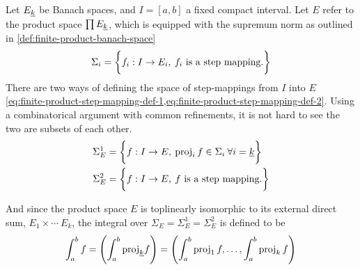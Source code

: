 \documentclass[../main-v2-manifolds.tex]{subfiles}
\begin{document}
Let $\UL{E}[k]$ be Banach spaces, and $I = [a,b]$ a fixed compact interval. Let $E$ refer  to the product space $\prod \UL{E}[k]$, which is equipped with the supremum norm as outlined in \cref{def:finite-product-banach-space}
\[
    \Sigma_i = \biggl\{{f_i:I \to E_i,\: f_i \text{ is a step mapping.}}\biggr\}
\]
There are two ways of defining the space of step-mappings from $I$ into $E$ \cref{eq:finite-product-step-mapping-def-1,eq:finite-product-step-mapping-def-2}. Using a combinatorical argument with common refinements, it is not hard to see the two are subsets of each other.
\begin{align}
    \Sigma_{E}^1 &= \biggl\{{f:I\to E,\: \operatorname{proj}_i f\in \Sigma_i\:\forall i = \underline{k}}\biggr\}\label{eq:finite-product-step-mapping-def-1}\\
    \Sigma_{E}^2 &= \biggl\{{f:I\to E,\: f \text{ is a step mapping.}}\biggr\}\label{eq:finite-product-step-mapping-def-2}
\end{align}

And since the product space $E$ is toplinearly isomorphic to its external direct sum, $E_1\times \cdots\ E_k$, the integral over $\Sigma_{E} = \Sigma_{E}^1 = \Sigma_E^2$ is defined to be 
\begin{equation}\label{eq:finite-product-integration-product-space}
    \int_a^b f = \qty(\int_a^b\UL{\proj}[k]f) = \qty(\int_a^b\proj_1 f,\ldots,\int_a^b\proj_k f)
\end{equation}
\end{document}
